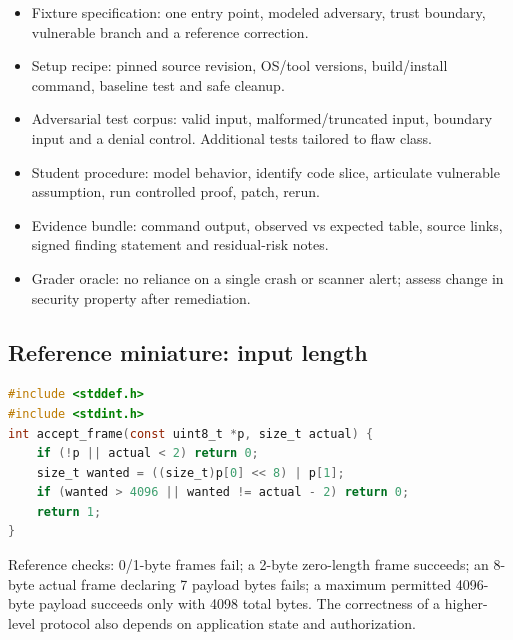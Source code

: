 \documentclass[10pt,letterpaper]{article}
\begin{document}
\begin{itemize}[leftmargin=*,itemsep=2pt]
\item Fixture specification: one entry point, modeled adversary, trust boundary, vulnerable branch and a reference correction.
\item Setup recipe: pinned source revision, OS/tool versions, build/install command, baseline test and safe cleanup.
\item Adversarial test corpus: valid input, malformed/truncated input, boundary input and a denial control. Additional tests tailored to flaw class.
\item Student procedure: model behavior, identify code slice, articulate vulnerable assumption, run controlled proof, patch, rerun.
\item Evidence bundle: command output, observed vs expected table, source links, signed finding statement and residual-risk notes.
\item Grader oracle: no reliance on a single crash or scanner alert; assess change in security property after remediation.
\end{itemize}
\subsection{Reference miniature: input length}
\begin{lstlisting}[language=C]
#include <stddef.h>
#include <stdint.h>
int accept_frame(const uint8_t *p, size_t actual) {
    if (!p || actual < 2) return 0;
    size_t wanted = ((size_t)p[0] << 8) | p[1];
    if (wanted > 4096 || wanted != actual - 2) return 0;
    return 1;
}
\end{lstlisting}
Reference checks: 0/1-byte frames fail; a 2-byte zero-length frame succeeds; an 8-byte actual frame declaring 7 payload bytes fails; a maximum permitted 4096-byte payload succeeds only with 4098 total bytes. The correctness of a higher-level protocol also depends on application state and authorization.
\end{document}
